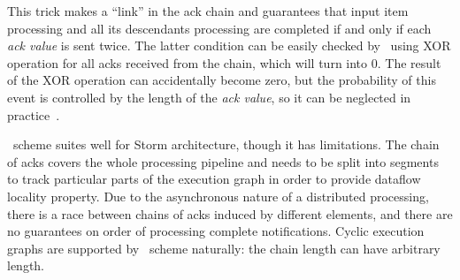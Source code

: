 This trick makes a ``link'' in the ack chain and guarantees that input item processing and all its descendants processing are completed if and only if each \textit{ack value} is sent twice. The latter condition can be easily checked by \acker\ using XOR operation for all acks received from the chain, which will turn into 0. The result of the XOR operation can accidentally become zero, but the probability of this event is controlled by the length of the \textit{ack value}, so it can be neglected in practice~\cite{apache:storm:acker}.

\acker\ scheme suites well for Storm architecture, though it has limitations. The chain of acks covers the whole processing pipeline and needs to be split into segments to track particular parts of the execution graph in order to provide dataflow locality property. Due to the asynchronous nature of a distributed processing, there is a race between chains of acks induced by different elements, and there are no guarantees on order of processing complete notifications. Cyclic execution graphs are supported by \acker\ scheme naturally: the chain length can have arbitrary length.





